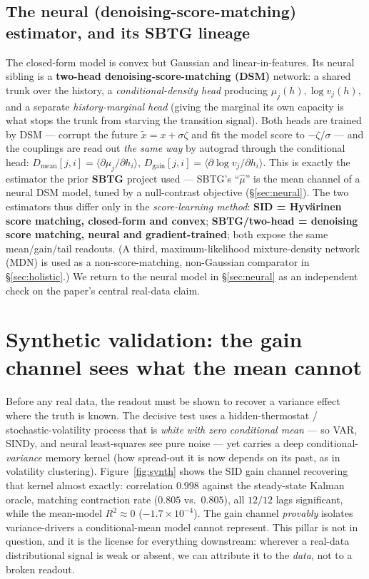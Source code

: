 \documentclass[11pt]{article}
\begin{document}
\subsection{The neural (denoising-score-matching) estimator, and its SBTG lineage}
\label{sec:twohead}
The closed-form model is convex but Gaussian and linear-in-features. Its neural sibling is a
\textbf{two-head denoising-score-matching (DSM)} network: a shared trunk over the history, a
\emph{conditional-density head} producing $\mu_j(h),\log v_j(h)$, and a separate
\emph{history-marginal head} (giving the marginal its own capacity is what stops the trunk from
starving the transition signal). Both heads are trained by DSM --- corrupt the future
$\tilde x=x+\sigma\zeta$ and fit the model score to $-\zeta/\sigma$ --- and the couplings are read out
\emph{the same way} by autograd through the conditional head:
$D_{\text{mean}}[j,i]=\langle\partial\mu_j/\partial h_i\rangle$,
$D_{\text{gain}}[j,i]=\langle\partial\log v_j/\partial h_i\rangle$. This is exactly the estimator the
prior \textbf{SBTG} project used --- SBTG's ``$\hat\mu$'' is the mean channel of a neural DSM model,
tuned by a null-contrast objective (\S\ref{sec:neural}). The two estimators thus differ only in the
\emph{score-learning method}: \textbf{SID = Hyv\"arinen score matching, closed-form and convex};
\textbf{SBTG/two-head = denoising score matching, neural and gradient-trained}; both expose the same
mean/gain/tail readouts. (A third, maximum-likelihood mixture-density network (MDN) is used as a
non-score-matching, non-Gaussian comparator in \S\ref{sec:holistic}.) We return to the neural model
in \S\ref{sec:neural} as an independent check on the paper's central real-data claim.

\section{Synthetic validation: the gain channel sees what the mean cannot}
\label{sec:synth}

Before any real data, the readout must be shown to recover a variance effect where the truth is
known. The decisive test uses a hidden-thermostat / stochastic-volatility process that is
\emph{white with zero conditional mean} --- so VAR, SINDy, and neural least-squares see pure noise
--- yet carries a deep conditional-\emph{variance} memory kernel (how spread-out it is now depends on
its past, as in volatility clustering). Figure~\ref{fig:synth} shows the SID gain channel recovering
that kernel almost exactly: correlation $0.998$ against the steady-state Kalman oracle, matching
contraction rate ($0.805$ vs.\ $0.805$), all $12/12$ lags significant, while the mean-model
$R^2\approx0$ ($-1.7\times10^{-4}$). The gain channel \emph{provably} isolates variance-drivers a
conditional-mean model cannot represent. This pillar is not in question, and it is the license for
everything downstream: wherever a real-data distributional signal is weak or absent, we can attribute
it to the \emph{data}, not to a broken readout.
\end{document}
